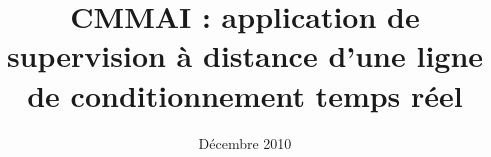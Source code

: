 \documentclass[a4paper]{report}
\title{CMMAI : application de supervision à distance d'une ligne de conditionnement temps réel}
\date{Décembre 2010}
\begin{document}
\maketitle

\vfill
\pagebreak

\tableofcontents

\vfill
\pagebreak

	
\end{document}
